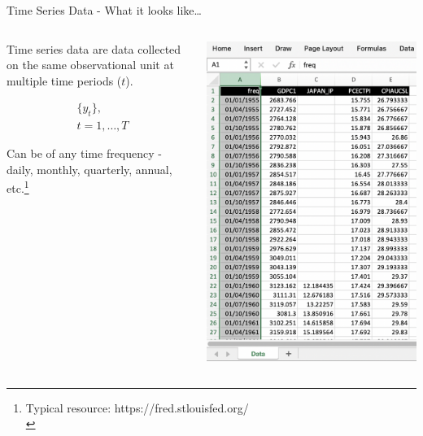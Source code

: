 \documentclass[
  10pt,
  ignorenonframetext,
]{beamer}
\begin{document}
\begin{frame}{Time Series Data - What it looks like\ldots{}}
\protect\hypertarget{time-series-data---what-it-looks-like}{}
\begin{columns}[T]
\begin{column}{.5\textwidth}
\vspace{7mm}

\small

Time series data are data collected on the same observational unit at
multiple time periods (\(t\)).

\vspace{2mm}

\[
\begin{aligned}
&\{y_{t}\}, \\
&t = 1,\ldots, T
\end{aligned}
\]

\vspace{2mm}

Can be of any time frequency - daily, monthly, quarterly, annual,
etc.\footnote[frame]{Typical resource: https://fred.stlouisfed.org/ \\}
\end{column}

\begin{column}{0.48\textwidth}
\begin{flushright}\includegraphics[width=0.9\linewidth]{pictures/TimeSeries-Example} \end{flushright}
\end{column}
\end{columns}
\end{frame}
\end{document}
